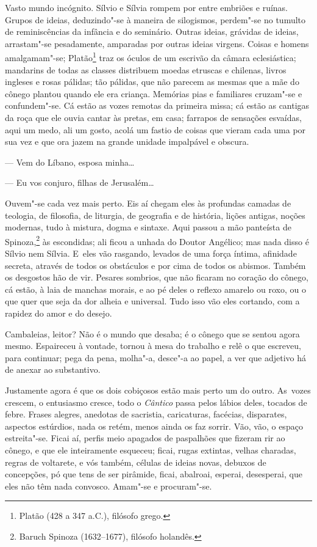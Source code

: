 \begin{linenumbers}
Vasto mundo incógnito. Sílvio e Sílvia rompem por entre embriões e
ruínas. Grupos de ideias, deduzindo"-se à maneira de silogismos,
perdem"-se no tumulto de reminiscências da infância e do seminário.
Outras ideias, grávidas de ideias, arrastam"-se pesadamente, amparadas
por outras ideias virgens. Coisas e homens amalgamam"-se;
Platão\footnote{Platão (428 a 347 a.C.), filósofo grego.} traz os óculos
de um escrivão da câmara eclesiástica; mandarins de todas as classes
distribuem moedas etruscas e chilenas, livros ingleses e rosas pálidas;
tão pálidas, que não parecem as mesmas que a mãe do cônego plantou
quando ele era criança. Memórias pias e familiares cruzam"-se e
confundem"-se. Cá estão as vozes remotas da primeira missa; cá estão as
cantigas da roça que ele ouvia cantar às pretas, em casa; farrapos de
sensações esvaídas, aqui um medo, ali um gosto, acolá um fastio de
coisas que vieram cada uma por sua vez e que ora jazem na grande unidade
impalpável e obscura.

--- Vem do Líbano, esposa minha\ldots{}

--- Eu vos conjuro, filhas de Jerusalém\ldots{}

Ouvem"-se cada vez mais perto. Eis aí chegam eles às profundas camadas de
teologia, de filosofia, de liturgia, de geografia e de história, lições
antigas, noções modernas, tudo à mistura, dogma e sintaxe. Aqui passou a
mão panteísta de Spinoza,\footnote{Baruch Spinoza (1632--1677), filósofo
  holandês.} às escondidas; ali ficou a unhada do Doutor Angélico; mas
nada disso é Sílvio nem Sílvia. E~eles vão rasgando, levados de uma
força íntima, afinidade secreta, através de todos os obstáculos e por
cima de todos os abismos. Também os desgostos hão de vir. Pesares
sombrios, que não ficaram no coração do cônego, cá estão, à laia de
manchas morais, e ao pé deles o reflexo amarelo ou roxo, ou o que quer
que seja da dor alheia e universal. Tudo isso vão eles cortando, com a
rapidez do amor e do desejo.

Cambaleias, leitor? Não é o mundo que desaba; é o cônego que se sentou
agora mesmo. Espaireceu à vontade, tornou à mesa do trabalho e relê o
que escreveu, para continuar; pega da pena, molha"-a, desce"-a ao papel, a
ver que adjetivo há de anexar ao substantivo.

Justamente agora é que os dois cobiçosos estão mais perto um do outro.
As~vozes crescem, o entusiasmo cresce, todo o \emph{Cântico} passa pelos
lábios deles, tocados de febre. Frases alegres, anedotas de sacristia,
caricaturas, facécias, disparates, aspectos estúrdios, nada os retém,
menos ainda os faz sorrir. Vão, vão, o espaço estreita"-se. Ficai aí,
perfis meio apagados de paspalhões que fizeram rir ao cônego, e que ele
inteiramente esqueceu; ficai, rugas extintas, velhas charadas, regras de
voltarete, e vós também, células de ideias novas, debuxos de concepções,
pó que tens de ser pirâmide, ficai, abalroai, esperai, desesperai, que
eles não têm nada convosco. Amam"-se e procuram"-se.


\end{linenumbers}
